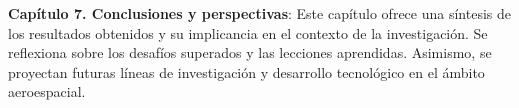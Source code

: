 \textbf{Capítulo 7. Conclusiones y perspectivas}:
Este capítulo ofrece una síntesis de los resultados obtenidos y su implicancia en el contexto de la investigación. Se reflexiona sobre los desafíos superados y las lecciones aprendidas. Asimismo, se proyectan futuras líneas de investigación y desarrollo tecnológico en el ámbito aeroespacial.


